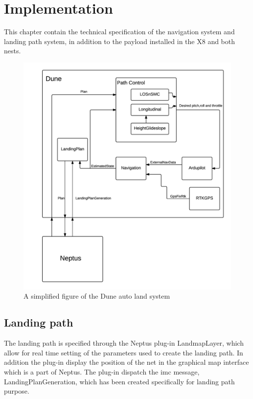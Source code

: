 \chapter{Implementation}
This chapter contain the technical specification of the navigation system and landing path system, in addition to the payload installed in the X8 and both nests.
\begin{figure}[H]
	\centering
		\includegraphics[width=1\textwidth]{figs/DUNESystem.png}
		\caption{A simplified figure of the Dune auto land system}
		\label{figure:RTKLIB_STRUCTURE}
\end{figure}
\section{Landing path}
The landing path is specified through the Neptus plug-in LandmapLayer, which allow for real time setting of the parameters used to create the landing path. In addition the plug-in display the position of the net in the graphical map interface which is a part of Neptus. The plug-in dispatch the \gls{imc} message, LandingPlanGeneration, which has been created specifically for landing path purpose.

